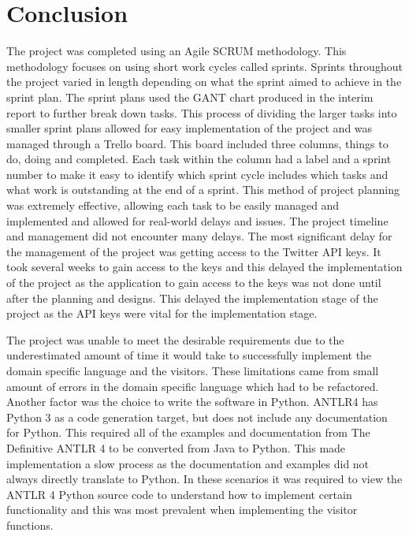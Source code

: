 \section{Conclusion}

The project was completed using an Agile SCRUM methodology. This methodology focuses on using short work cycles called sprints. Sprints throughout the project varied in length depending on what the sprint aimed to achieve in the sprint plan. The sprint plans used the GANT chart produced in the interim report to further break down tasks. This process of dividing the larger tasks into smaller sprint plans allowed for easy implementation of the project and was managed through a Trello board. This board included three columns, things to do, doing and completed. Each task within the column had a label and a sprint number to make it easy to identify which sprint cycle includes which tasks and what work is outstanding at the end of a sprint. This method of project planning was extremely effective, allowing each task to be easily managed and implemented and allowed for real-world delays and issues. The project timeline and management did not encounter many delays. The most significant delay for the management of the project was getting access to the Twitter API keys. It took several weeks to gain access to the keys and this delayed the implementation of the project as the application to gain access to the keys was not done until after the planning and designs. This delayed the implementation stage of the project as the API keys were vital for the implementation stage. \newline \par

The project was unable to meet the desirable requirements due to the underestimated amount of time it would take to successfully implement the domain specific language and the visitors. These limitations came from small amount of errors in the domain specific language which had to be refactored. Another factor was the choice to write the software in Python. ANTLR4 has Python 3 as a code generation target, but does not include any documentation for Python. This required all of the examples and documentation from The Definitive ANTLR 4 \cite{parr2013definitive} to be converted from Java to Python. This made implementation a slow process as the documentation and examples did not always directly translate to Python. In these scenarios it was required to view the ANTLR 4 Python source code to understand how to implement certain functionality and this was most prevalent when implementing the visitor functions. \newline \par

